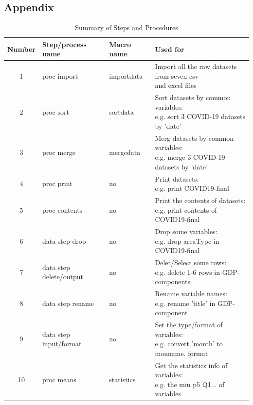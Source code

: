 \documentclass[12pt, a4paper]{report}
\begin{document}
\begin{appendices}
\renewcommand\thefigure{\Alph{section}\arabic{figure}}  
\section{Appendix}
\setcounter{table}{0}
\begin{table}[H]
    \caption{Summary of Steps and Procedures}
    \begin{tabular}{|c|l|l|l|}
        \hline
        Number&Step/process name&Macro name&Used for\\
        \hline
        1&proc import&importdata&\makecell[l]{Import all the raw datasets from seven csv \\and excel files}\\
        \hline
        2&proc sort&sortdata&\makecell[l]{Sort datasets by common variables:\\e.g. sort 3 COVID-19 datasets by 'date'}\\
        \hline
        3&proc merge&mergedata&\makecell[l]{Merg datasets by common variables:\\e.g. merge 3 COVID-19 datasets by 'date'}\\
        \hline
        4&proc print&no&\makecell[l]{Print datasets:\\e.g. print COVID19-final}\\
        \hline
        5&proc contents&no&\makecell[l]{Print the contents of datasets:\\e.g. print contents of COVID19-final}\\
        \hline
        6&data step drop&no&\makecell[l]{Drop some variables:\\e.g. drop areaType in COVID19-final}\\
        \hline
        7&data step delete/output&no&\makecell[l]{Delet/Select some rows:\\e.g. delete 1-6 rows in GDP-components}\\
        \hline
        8&data step rename&no&\makecell[l]{Rename variable names:\\e.g. rename 'title' in GDP-component}\\
        \hline
        9&data step input/format&no&\makecell[l]{Set the type/format of variables:\\e.g. convert 'month' to monname. format}\\
        \hline
        10&proc means&statistics&\makecell[l]{Get the statistics info of variables:\\e.g. the min p5 Q1... of variables}\\

\end{tabular}
\end{table}
\end{appendices}
\end{document}
